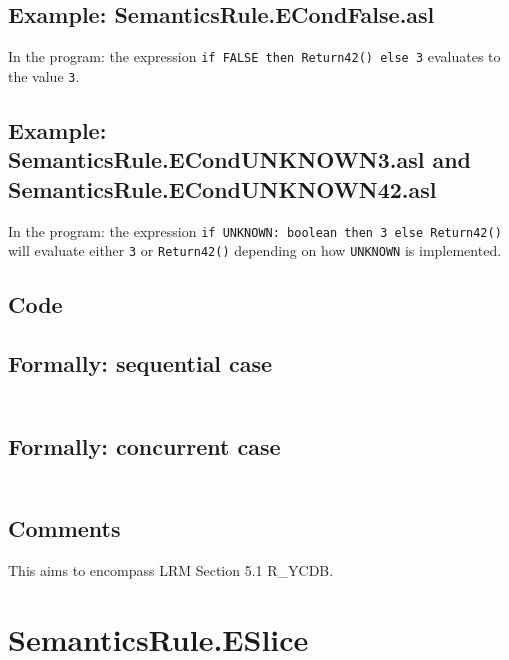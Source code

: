 \documentclass{book}
\begin{document}
  \subsection{Example: SemanticsRule.ECondFalse.asl}
    In the program:
    the expression \texttt{if FALSE then Return42() else 3} evaluates to the value \texttt{3}.

  \subsection{Example: SemanticsRule.ECondUNKNOWN3.asl and SemanticsRule.ECondUNKNOWN42.asl}
    In the program:
    the expression \texttt{if UNKNOWN: boolean then 3 else Return42()} will evaluate
    either \texttt{3} or \texttt{Return42()} depending on how \texttt{UNKNOWN} is implemented.

  \subsection{Code}

  \subsection{Formally: sequential case}
  \begin{align}
  \end{align} 

  \subsection{Formally: concurrent case}
  \begin{align}
  \end{align} 

  \subsection{Comments}
  This aims to encompass LRM Section 5.1 R\_YCDB.

\section{SemanticsRule.ESlice \label{sec:SemanticsRule.ESlice}}
\end{document}
